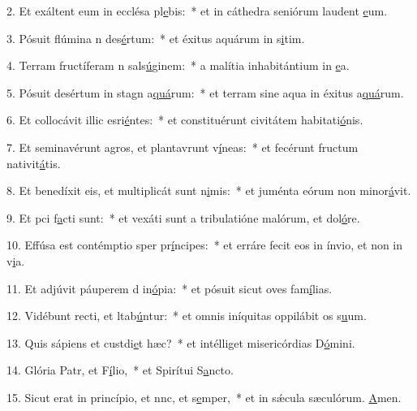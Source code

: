 2. Et exáltent eum in ecclésa pl\uline{e}bis:~* et in cáthedra seniórum laudent \uline{e}um.\par 
3. Pósuit flúmina n des\uline{é}rtum:~* et éxitus aquárum in s\uline{i}tim.\par 
4. Terram fructíferam n sals\uline{ú}ginem:~* a malítia inhabitántium in \uline{e}a.\par 
5. Pósuit desértum in stagn a\uline{quá}rum:~* et terram sine aqua in éxitus a\uline{quá}rum.\par 
6. Et collocávit illic esri\uline{é}ntes:~* et constituérunt civitátem habitati\uline{ó}nis.\par 
7. Et seminavérunt agros, et plantavrunt v\uline{í}neas:~* et fecérunt fructum nativit\uline{á}tis.\par 
8. Et benedíxit eis, et multiplicát sunt n\uline{i}mis:~* et juménta eórum non minor\uline{á}vit.\par 
9. Et pci f\uline{a}cti sunt:~* et vexáti sunt a tribulatióne malórum, et dol\uline{ó}re.\par 
10. Effúsa est contémptio sper pr\uline{í}ncipes:~* et erráre fecit eos in ínvio, et non in v\uline{i}a.\par 
11. Et adjúvit páuperem d in\uline{ó}pia:~* et pósuit sicut oves fam\uline{í}lias.\par 
12. Vidébunt recti, et ltab\uline{ú}ntur:~* et omnis iníquitas oppilábit os s\uline{u}um.\par 
13. Quis sápiens et custdi\uline{e}t hæc?~* et intélliget misericórdias D\uline{ó}mini.\par 
14. Glória Patr, et F\uline{í}lio,~* et Spirítui S\uline{a}ncto.\par 
15. Sicut erat in princípio, et nnc, et s\uline{e}mper,~* et in sǽcula sæculórum. \uline{A}men.\par 
